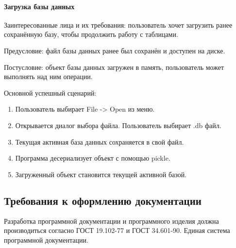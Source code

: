 \paragraph{Загрузка базы данных}

Заинтересованные лица и их требования: пользователь хочет загрузить ранее сохранённую базу, чтобы продолжить работу с таблицами.

Предусловие: файл базы данных ранее был сохранён и доступен на диске.

Постусловие: объект базы данных загружен в память, пользователь может выполнять над ним операции.

Основной успешный сценарий:
\begin{enumerate}
	\item Пользователь выбирает File -> Open из меню.	
	\item Открывается диалог выбора файла. Пользователь выбирает .db файл.	
	\item Текущая активная база данных сохраняется в свой файл.
	\item Программа десериализует объект с помощью pickle.	
	\item Загруженный объект становится текущей активной базой.	
\end{enumerate}

\subsection{Требования к оформлению документации}

Разработка программной документации и программного изделия должна производиться согласно ГОСТ 19.102-77 и ГОСТ 34.601-90. Единая система программной документации.
